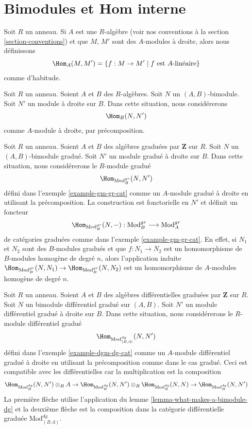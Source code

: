 \section{Bimodules et Hom interne}
\label{section-bimodules-hom}

\noindent
Soit $R$ un anneau. Si $A$ est une $R$-algèbre (voir nos conventions à la
section \ref{section-conventions}) et que $M$, $M'$ sont des $A$-modules à
droite, alors nous définissons
$$
\Hom_A(M, M') = \{f : M \to M' \mid f \text{ est }A\text{-linéaire}\}
$$
comme d'habitude.

\medskip\noindent
Soit $R$ un anneau. Soient $A$ et $B$ des $R$-algèbres. Soit
$N$ un $(A, B)$-bimodule. Soit $N'$ un module à droite sur $B$.
Dans cette situation, nous considérerons
$$
\Hom_B(N, N')
$$
comme $A$-module à droite, par précomposition.

\medskip\noindent
Soit $R$ un anneau. Soient $A$ et $B$ des algèbres graduées par $\mathbf{Z}$ sur
$R$. Soit $N$ un $(A, B)$-bimodule gradué. Soit $N'$ un module gradué à droite sur
$B$. Dans cette situation, nous considérerons le $R$-module gradué
$$
\Hom_{\text{Mod}^{gr}_B}(N, N')
$$
défini dans l'exemple \ref{example-gm-gr-cat} comme un $A$-module gradué à droite
en utilisant la précomposition. La construction est fonctorielle en $N'$ et définit
un foncteur
$$
\Hom_{\text{Mod}^{gr}_B}(N, -) :
\text{Mod}^{gr}_B
\longrightarrow
\text{Mod}^{gr}_A
$$
de catégories graduées comme dans l'exemple \ref{example-gm-gr-cat}. En
effet, si $N_1$ et $N_2$ sont des $B$-modules gradués et que $f : N_1 \to N_2$ est un
homomorphisme de $B$-modules homogène de degré $n$, alors l'application
induite $\Hom_{\text{Mod}^{gr}_B}(N, N_1) \to \Hom_{\text{Mod}^{gr}_B}(N, N_2)$
est un homomorphisme de $A$-modules homogène de degré $n$.

\medskip\noindent
Soit $R$ un anneau. Soient $A$ et $B$ des algèbres différentielles graduées
par $\mathbf{Z}$ sur $R$. Soit $N$ un bimodule différentiel gradué sur $(A,
B)$. Soit $N'$ un module différentiel gradué à droite sur $B$. Dans cette
situation, nous considérerons le $R$-module différentiel gradué
$$
\Hom_{\text{Mod}^{dg}_{(B, \text{d})}}(N, N')
$$
défini dans l'exemple \ref{example-dgm-dg-cat} comme un $A$-module
différentiel gradué à droite en utilisant la précomposition comme dans le cas gradué.
Ceci est compatible avec les différentielles car la multiplication est la
composition
$$
\Hom_{\text{Mod}^{dg}_B}(N, N') \otimes_R A \to
\Hom_{\text{Mod}^{dg}_B}(N, N') \otimes_R
\Hom_{\text{Mod}^{dg}_B}(N, N) \to
\Hom_{\text{Mod}^{dg}_B}(N, N')
$$
La première flèche utilise
l'application du lemme \ref{lemma-what-makes-a-bimodule-dg} et la
deuxième flèche est la composition dans la catégorie différentielle
graduée $\text{Mod}^{dg}_{(B, \text{d})}$.

